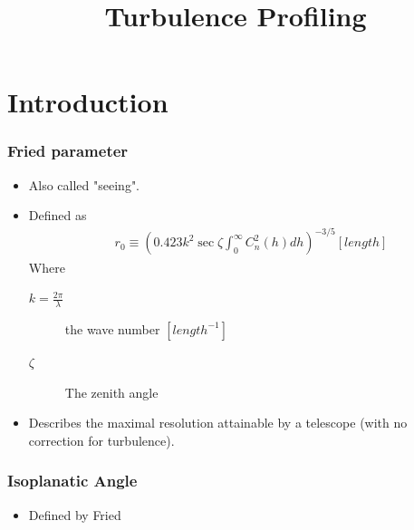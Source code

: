 \documentclass{beamer}
\title{Turbulence Profiling}
\begin{document}
\frame{\titlepage}
\section{Introduction}
\frame %
{
	\frametitle{Fried parameter}
	\begin{itemize}
		\item Also called "seeing". 
		\item Defined as \cite{mohr2009atmospheric}
			\begin{align*}
				&r_0\equiv \left(0.423k^2\sec\zeta\int_{0}^{\infty} C_n^2(h)dh \right)^{-3/5} \left[length\right] 
			\end{align*}
			Where
			\begin{description}
				\item[$\displaystyle k=\frac{2\pi}{\lambda}$] the wave number $\displaystyle \left[length^{-1}\right]$
				\item[$\zeta$] The zenith angle
			\end{description}
		\item Describes the maximal resolution attainable by a telescope (with no correction for turbulence). 
	\end{itemize}
}
\frame
{
	\frametitle{Isoplanatic Angle \cite{roggemann1996imaging}}
	\begin{itemize}
		\item Defined by Fried 
	\end{itemize}
}
\frame[label={triangulation}]
\end{document}
